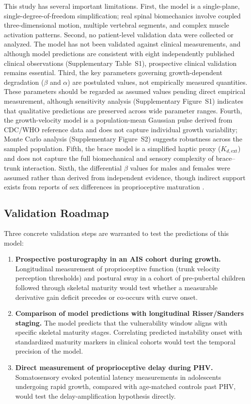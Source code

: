 \documentclass[12pt,a4paper]{article}
\begin{document}
This study has several important limitations. First, the model is a single-plane, single-degree-of-freedom simplification; real spinal biomechanics involve coupled three-dimensional motion, multiple vertebral segments, and complex muscle activation patterns. Second, no patient-level validation data were collected or analyzed. The model has not been validated against clinical measurements, and although model predictions are consistent with eight independently published clinical observations (Supplementary Table~S1), prospective clinical validation remains essential. Third, the key parameters governing growth-dependent degradation ($\beta$ and $\alpha$) are postulated values, not empirically measured quantities. These parameters should be regarded as assumed values pending direct empirical measurement, although sensitivity analysis (Supplementary Figure~S1) indicates that qualitative predictions are preserved across wide parameter ranges. Fourth, the growth-velocity model is a population-mean Gaussian pulse derived from CDC/WHO reference data and does not capture individual growth variability; Monte Carlo analysis (Supplementary Figure~S2) suggests robustness across the sampled population. Fifth, the brace model is a simplified haptic proxy ($K_{d,\text{ext}}$) and does not capture the full biomechanical and sensory complexity of brace--trunk interaction. Sixth, the differential $\beta$ values for males and females were assumed rather than derived from independent evidence, though indirect support exists from reports of sex differences in proprioceptive maturation \citep{hirabayashi2009age, tanner1966growth}.

\subsection{Validation Roadmap}

Three concrete validation steps are warranted to test the predictions of this model:

\begin{enumerate}
\item \textbf{Prospective posturography in an AIS cohort during growth.} Longitudinal measurement of proprioceptive function (trunk velocity perception thresholds) and postural sway in a cohort of pre-pubertal children followed through skeletal maturity would test whether a measurable derivative gain deficit precedes or co-occurs with curve onset.

\item \textbf{Comparison of model predictions with longitudinal Risser/Sanders staging.} The model predicts that the vulnerability window aligns with specific skeletal maturity stages. Correlating predicted instability onset with standardized maturity markers in clinical cohorts would test the temporal precision of the model.

\item \textbf{Direct measurement of proprioceptive delay during PHV.} Somatosensory evoked potential latency measurements in adolescents undergoing rapid growth, compared with age-matched controls past PHV, would test the delay-amplification hypothesis directly.
\end{enumerate}
\end{document}
